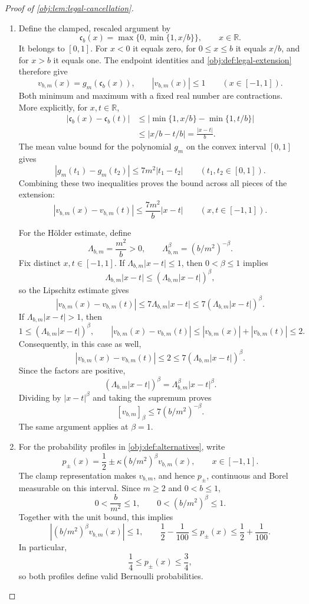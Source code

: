 \begin{proof}[Proof of \cref{obj:lem:legal-cancellation}]
\begin{enumerate}
\item Define the clamped, rescaled argument by
\[
\mathfrak c_b(x)=\max\{0,\min\{1,x/b\}\},
\qquad x\in\mathbb R.
\]
It belongs to \([0,1]\). For \(x<0\) it equals zero, for \(0\le x\le b\) it equals \(x/b\), and for \(x>b\) it equals one. The endpoint identities and \cref{obj:def:legal-extension} therefore give
\[
v_{b,m}(x)=g_m(\mathfrak c_b(x)),
\qquad
|v_{b,m}(x)|\le1
\qquad(x\in[-1,1]).
\]
Both minimum and maximum with a fixed real number are contractions. More explicitly, for \(x,t\in\mathbb R\),
\[
\begin{aligned}
|\mathfrak c_b(x)-\mathfrak c_b(t)|
&\le|\min\{1,x/b\}-\min\{1,t/b\}|\\
&\le|x/b-t/b|
=\frac{|x-t|}{b}.
\end{aligned}
\]
The mean value bound for the polynomial \(g_m\) on the convex interval \([0,1]\) gives
\[
|g_m(t_1)-g_m(t_2)|
\le7m^2|t_1-t_2|
\qquad(t_1,t_2\in[0,1]).
\]
Combining these two inequalities proves the bound across all pieces of the extension:
\[
|v_{b,m}(x)-v_{b,m}(t)|
\le\frac{7m^2}{b}|x-t|
\qquad(x,t\in[-1,1]).
\]

For the Hölder estimate, define
\[
\Lambda_{b,m}=\frac{m^2}{b}>0,
\qquad
\Lambda_{b,m}^{\beta}=(b/m^2)^{-\beta}.
\]
Fix distinct \(x,t\in[-1,1]\). If \(\Lambda_{b,m}|x-t|\le1\), then \(0<\beta\le1\) implies
\[
\Lambda_{b,m}|x-t|
\le(\Lambda_{b,m}|x-t|)^\beta,
\]
so the Lipschitz estimate gives
\[
|v_{b,m}(x)-v_{b,m}(t)|
\le7\Lambda_{b,m}|x-t|
\le7(\Lambda_{b,m}|x-t|)^\beta.
\]
If \(\Lambda_{b,m}|x-t|>1\), then
\[
1\le(\Lambda_{b,m}|x-t|)^\beta,
\qquad
|v_{b,m}(x)-v_{b,m}(t)|
\le|v_{b,m}(x)|+|v_{b,m}(t)|\le2.
\]
Consequently, in this case as well,
\[
|v_{b,m}(x)-v_{b,m}(t)|
\le2\le7(\Lambda_{b,m}|x-t|)^\beta.
\]
Since the factors are positive,
\[
(\Lambda_{b,m}|x-t|)^\beta
=\Lambda_{b,m}^\beta|x-t|^\beta.
\]
Dividing by \(|x-t|^\beta\) and taking the supremum proves
\[
[v_{b,m}]_\beta\le7(b/m^2)^{-\beta}.
\]
The same argument applies at \(\beta=1\).

\item For the probability profiles in \cref{obj:def:alternatives}, write
\[
p_\pm(x)=\frac12\pm\kappa(b/m^2)^\beta v_{b,m}(x),
\qquad x\in[-1,1].
\]
The clamp representation makes \(v_{b,m}\), and hence \(p_\pm\), continuous and Borel measurable on this interval. Since \(m\ge2\) and \(0<b\le1\),
\[
0<\frac b{m^2}\le1,
\qquad
0<(b/m^2)^\beta\le1.
\]
Together with the unit bound, this implies
\[
|(b/m^2)^\beta v_{b,m}(x)|\le1,
\qquad
\frac12-\frac1{100}\le p_\pm(x)\le\frac12+\frac1{100}.
\]
In particular,
\[
\frac14\le p_\pm(x)\le\frac34,
\]
so both profiles define valid Bernoulli probabilities.


\end{enumerate}
\end{proof}

